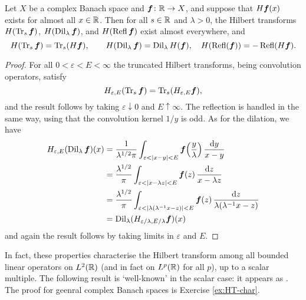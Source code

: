 \begin{prop}
  Let $X$ be a complex Banach space and $\bm{f} \colon \mathbb{R} \rightarrow X$, and suppose that $H\bm{f}(x)$ exists for almost all $x \in \mathbb{R}$.
  Then for all $s \in \mathbb{R}$ and $\lambda > 0$, the Hilbert transforms $H(\operatorname{Tr}_{s} \bm{f})$, $H(\operatorname{Dil}_{\lambda} \bm{f})$, and $H(\operatorname{Refl} \bm{f})$  exist almost everywhere, and
  \begin{equation*}
    H(\operatorname{Tr}_{s} \bm{f}) = \operatorname{Tr}_{s} (H\bm{f}), \qquad H(\operatorname{Dil}_{\lambda} \bm{f}) = \operatorname{Dil}_{\lambda} H(\bm{f}), \quad H(\operatorname{Refl}(\bm{f})) = -\operatorname{Refl}(H\bm{f}).
  \end{equation*}
\end{prop}

\begin{proof}
  For all $0 < \varepsilon < E < \infty$ the truncated Hilbert transforms, being convolution operators, satisfy
  \begin{equation*}
    H_{\varepsilon,E}(\operatorname{Tr}_{s} \bm{f}) = \operatorname{Tr}_{s} (H_{\varepsilon,E} \bm{f}),
  \end{equation*}
  and the result follows by taking $\varepsilon \downarrow 0$ and $E \uparrow \infty$.
  The reflection is handled in the same way, using that the convolution kernel $1/y$ is odd.
  As for the dilation, we have
  \begin{equation*}
    \begin{aligned}
      H_{\varepsilon,E}(\operatorname{Dil}_{\lambda} \bm{f})(x)
      &= \frac{1}{\lambda^{1/2}\pi} \int_{\varepsilon < |x-y| < E}  \bm{f}\Big(\frac{y}{\lambda}\Big) \, \frac{\mathrm{d} y}{x-y} \\
      &= \frac{\lambda^{1/2}}{\pi} \int_{\varepsilon < |x - \lambda z| < E} \bm{f}(z) \, \frac{\mathrm{d} z}{x - \lambda z} \\
      &= \frac{\lambda^{1/2}}{\pi} \int_{\varepsilon < |\lambda(\lambda^{-1}x - z)| < E} \bm{f}(z) \, \frac{\mathrm{d} z}{\lambda(\lambda^{-1}x - z)} \\
      &= \operatorname{Dil}_{\lambda}(H_{\varepsilon/\lambda, E/\lambda} \bm{f})(x)
    \end{aligned}
  \end{equation*}
  and again the result follows by taking limits in $\varepsilon$ and $E$.
\end{proof}

In fact, these properties characterise the Hilbert transform among all bounded linear operators on $L^2(\mathbb{R})$ (and in fact on $L^p(\mathbb{R})$ for all $p$), up to a scalar multiple.
The following result is `well-known' in the scalar case: it appears as \cite[Exercise 5.1.11]{grafakos}.
The proof for geenral complex Banach spaces is Exercise \ref{ex:HT-char}.%

